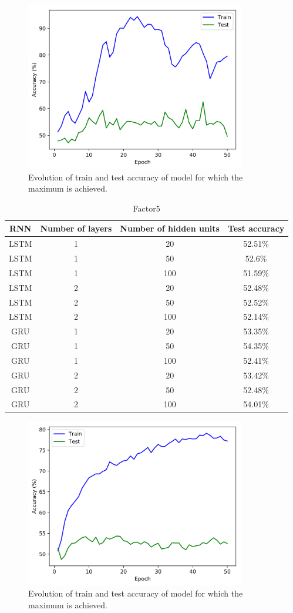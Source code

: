 \documentclass[titlepage]{report}
\newcommand{\otoprule}{\midrule[\heavyrulewidth]}
\begin{document}
\begin{figure}[H]
\centering
\includegraphics[width = 96mm]{figures/plots/gru_2_100_6250}
\caption{Evolution of train and test accuracy of model for which the maximum is achieved.}
\end{figure}

\begin{table}[H]
\caption{Factor5}
\centering
\begin{tabular}{cccc}
\toprule%
\textbf{RNN} & \textbf{Number of layers} & \textbf{Number of hidden units} & \textbf{Test accuracy} \\
\otoprule%
LSTM & 1 & 20 & 52.51\% \\
LSTM & 1 & 50 & 52.6\% \\
LSTM & 1 & 100 & 51.59\% \\
LSTM & 2 & 20 & 52.48\% \\
LSTM & 2 & 50 & 52.52\% \\
LSTM & 2 & 100 & 52.14\% \\
GRU & 1 & 20 & 53.35\% \\ 
GRU & 1 & 50 & 54.35\% \\
GRU & 1 & 100 & 52.41\% \\
GRU & 2 & 20 & 53.42\% \\
GRU & 2 & 50 & 52.48\% \\
GRU & 2 & 100 & 54.01\% \\
\bottomrule
\end{tabular}
\end{table}

\begin{figure}[H]
\centering
\includegraphics[width = 96mm]{figures/plots/gru_1_50_5435}
\caption{Evolution of train and test accuracy of model for which the maximum is achieved.}
\end{figure}
\end{document}
